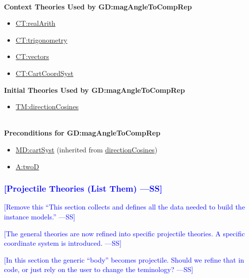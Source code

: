 \documentclass[12pt]{article}
\newcommand{\authornote}[3]{\textcolor{#1}{[#3 ---#2]}}
\newcommand{\authornote}[3]{}
\newcommand{\wss}[1]{\authornote{blue}{SS}{#1}}
\begin{document}
~\\
\noindent \textbf{Context Theories Used by GD:magAngleToCompRep}

\begin{itemize}
\item \hyperref[CT:realArith]{CT:realArith}
\item \hyperref[CT:trigonometry]{CT:trigonometry}
\item \hyperref[CT:vectors]{CT:vectors}
\item \hyperref[CT:CartCoordSyst]{CT:CartCoordSyst}
\end{itemize}

\noindent \textbf{Initial Theories Used by GD:magAngleToCompRep}

\begin{itemize}
\item \hyperref[TM:directionCosines]{TM:directionCosines}
\end{itemize}

~\\
\noindent \textbf{Preconditions for GD:magAngleToCompRep}

\begin{itemize}
\item \hyperref[MD:cartSyst]{MD:cartSyst} (inherited from \hyperref[directionCosines]{directionCosines})
\item \hyperref[twoD]{A:twoD}
\end{itemize}

\subsubsection{\wss{Projectile Theories (List Them)}}
\label{Sec:DDs}
\wss{Remove this ``This section collects and defines all the data needed to
build the instance models.''}

\wss{The general theories are now refined into specific projectile theories.
A specific coordinate system is introduced.}

\wss{In this section the generic ``body'' becomes projectile.  Should we refine
that in code, or just rely on the user to change the teminology?}
\end{document}

